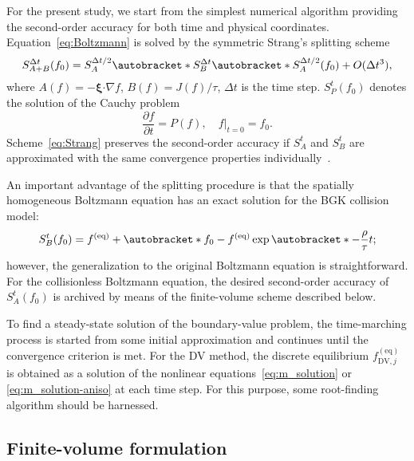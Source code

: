 \documentclass{elsarticle} %
\newcommand{\pder}[2][]{\frac{\partial#1}{\partial#2}}
\newcommand{\OO}[1]{O(#1)}
\DeclarePairedDelimiter\autobracket()       %
\newcommand{\br}[1]{\autobracket*{#1}}
\newcommand{\bxi}{\boldsymbol{\xi}}
\newcommand{\bdot}{\boldsymbol{\cdot}}
\newcommand{\equil}[1]{#1^\mathrm{(eq)}}
\newcommand{\DV}{\mathrm{DV}}
\begin{document}
For the present study, we start from the simplest numerical algorithm providing the second-order accuracy
for both time and physical coordinates.
Equation~\eqref{eq:Boltzmann} is solved by the symmetric Strang's splitting scheme
\begin{equation}\label{eq:Strang}
    S^{\Delta{t}}_{A+B}(f_0) = S^{\Delta{t}/2}_A \br{S^{\Delta{t}}_B \br{S^{\Delta{t}/2}_A(f_0)} } + \OO{\Delta{t}^3},
\end{equation}
where \(A(f) = -\bxi\bdot\nabla{f}\), \(B(f) = J(f)/\tau\), \(\Delta{t}\) is the time step.
\(S^t_P(f_0)\) denotes the solution of the Cauchy problem
\begin{equation}\label{eq:Cauchy}
    \pder[f]{t} = P(f), \quad f|_{t=0} = f_0.
\end{equation}
Scheme~\eqref{eq:Strang} preserves the second-order accuracy if \(S^t_A\) and \(S^t_B\)
are approximated with the same convergence properties individually~\cite{Bobylev2001}.

An important advantage of the splitting procedure is that the spatially homogeneous Boltzmann equation
has an exact solution for the BGK collision model:
\begin{equation}\label{eq:bgk_exact}
    S^t_B(f_0) = \equil{f} + \br{f_0-\equil{f}}\exp\br{-\frac\rho\tau t};
\end{equation}
however, the generalization to the original Boltzmann equation is straightforward.
For the collisionless Boltzmann equation, the desired second-order accuracy of \(S^t_A(f_0)\)
is archived by means of the finite-volume scheme described below.

To find a steady-state solution of the boundary-value problem,
the time-marching process is started from some initial approximation
and continues until the convergence criterion is met.
For the DV method, the discrete equilibrium \(\equil{f}_{\DV,j}\) is obtained as a solution
of the nonlinear equations~\eqref{eq:m_solution} or \eqref{eq:m_solution-aniso} at each time step.
For this purpose, some root-finding algorithm should be harnessed.

\subsection{Finite-volume formulation}\label{sec:numerics:fv}
\end{document}
